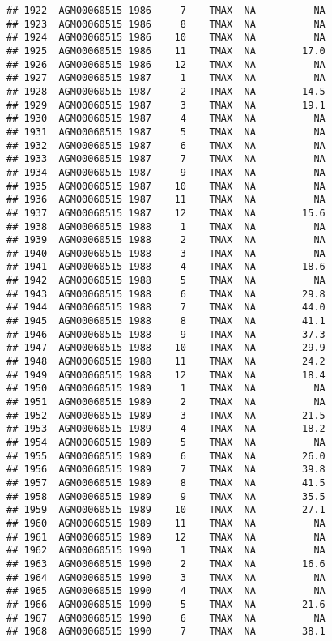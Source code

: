 \documentclass{article}\usepackage[]{graphicx}\usepackage[]{color}
\makeatletter
\newenvironment{kframe}{%
 \def\at@end@of@kframe{}%
 \ifinner\ifhmode%
  \def\at@end@of@kframe{\end{minipage}}%
  \begin{minipage}{\columnwidth}%
 \fi\fi%
 \def\FrameCommand##1{\hskip\@totalleftmargin \hskip-\fboxsep
 \colorbox{shadecolor}{##1}\hskip-\fboxsep
     \hskip-\linewidth \hskip-\@totalleftmargin \hskip\columnwidth}%
 \MakeFramed {\advance\hsize-\width
   \@totalleftmargin\z@ \linewidth\hsize
   \@setminipage}}%
 {\par\unskip\endMakeFramed%
 \at@end@of@kframe}
\newenvironment{knitrout}{}{} %
\makeatother
\begin{document}
\begin{knitrout}
\begin{kframe}
\begin{verbatim}
## 1922  AGM00060515 1986     7    TMAX  NA          NA
## 1923  AGM00060515 1986     8    TMAX  NA          NA
## 1924  AGM00060515 1986    10    TMAX  NA          NA
## 1925  AGM00060515 1986    11    TMAX  NA        17.0
## 1926  AGM00060515 1986    12    TMAX  NA          NA
## 1927  AGM00060515 1987     1    TMAX  NA          NA
## 1928  AGM00060515 1987     2    TMAX  NA        14.5
## 1929  AGM00060515 1987     3    TMAX  NA        19.1
## 1930  AGM00060515 1987     4    TMAX  NA          NA
## 1931  AGM00060515 1987     5    TMAX  NA          NA
## 1932  AGM00060515 1987     6    TMAX  NA          NA
## 1933  AGM00060515 1987     7    TMAX  NA          NA
## 1934  AGM00060515 1987     9    TMAX  NA          NA
## 1935  AGM00060515 1987    10    TMAX  NA          NA
## 1936  AGM00060515 1987    11    TMAX  NA          NA
## 1937  AGM00060515 1987    12    TMAX  NA        15.6
## 1938  AGM00060515 1988     1    TMAX  NA          NA
## 1939  AGM00060515 1988     2    TMAX  NA          NA
## 1940  AGM00060515 1988     3    TMAX  NA          NA
## 1941  AGM00060515 1988     4    TMAX  NA        18.6
## 1942  AGM00060515 1988     5    TMAX  NA          NA
## 1943  AGM00060515 1988     6    TMAX  NA        29.8
## 1944  AGM00060515 1988     7    TMAX  NA        44.0
## 1945  AGM00060515 1988     8    TMAX  NA        41.1
## 1946  AGM00060515 1988     9    TMAX  NA        37.3
## 1947  AGM00060515 1988    10    TMAX  NA        29.9
## 1948  AGM00060515 1988    11    TMAX  NA        24.2
## 1949  AGM00060515 1988    12    TMAX  NA        18.4
## 1950  AGM00060515 1989     1    TMAX  NA          NA
## 1951  AGM00060515 1989     2    TMAX  NA          NA
## 1952  AGM00060515 1989     3    TMAX  NA        21.5
## 1953  AGM00060515 1989     4    TMAX  NA        18.2
## 1954  AGM00060515 1989     5    TMAX  NA          NA
## 1955  AGM00060515 1989     6    TMAX  NA        26.0
## 1956  AGM00060515 1989     7    TMAX  NA        39.8
## 1957  AGM00060515 1989     8    TMAX  NA        41.5
## 1958  AGM00060515 1989     9    TMAX  NA        35.5
## 1959  AGM00060515 1989    10    TMAX  NA        27.1
## 1960  AGM00060515 1989    11    TMAX  NA          NA
## 1961  AGM00060515 1989    12    TMAX  NA          NA
## 1962  AGM00060515 1990     1    TMAX  NA          NA
## 1963  AGM00060515 1990     2    TMAX  NA        16.6
## 1964  AGM00060515 1990     3    TMAX  NA          NA
## 1965  AGM00060515 1990     4    TMAX  NA          NA
## 1966  AGM00060515 1990     5    TMAX  NA        21.6
## 1967  AGM00060515 1990     6    TMAX  NA          NA
## 1968  AGM00060515 1990     7    TMAX  NA        38.1

\end{verbatim}
\end{kframe}
\end{knitrout}
\end{document}
